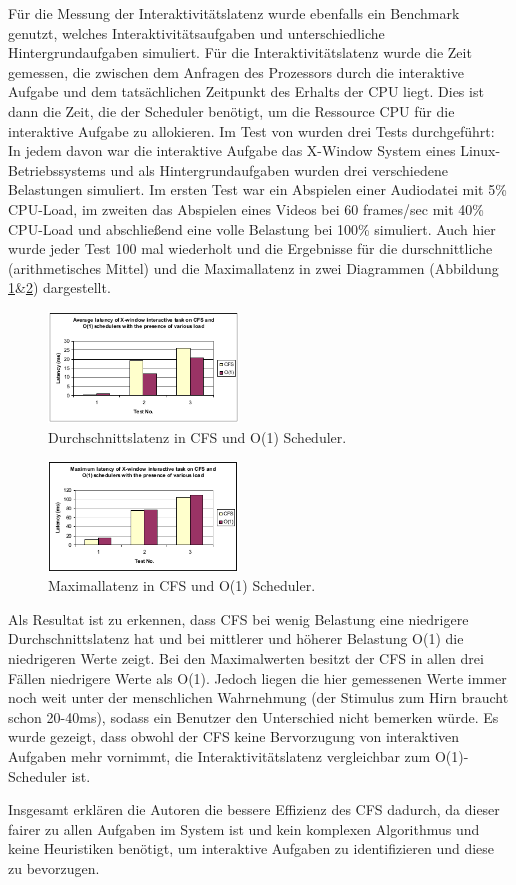 Für die Messung der Interaktivitätslatenz wurde ebenfalls ein Benchmark genutzt, welches Interaktivitätsaufgaben und unterschiedliche Hintergrundaufgaben simuliert. Für die Interaktivitätslatenz wurde die Zeit gemessen, die zwischen dem Anfragen des Prozessors durch die interaktive Aufgabe und dem tatsächlichen Zeitpunkt des Erhalts der CPU liegt. Dies ist dann die Zeit, die der Scheduler benötigt, um die Ressource CPU für die interaktive Aufgabe zu allokieren. Im Test von \cite{papercomparison} wurden drei Tests durchgeführt: In jedem davon war die interaktive Aufgabe das X-Window System eines Linux-Betriebssystems und als Hintergrundaufgaben wurden drei verschiedene Belastungen simuliert. Im ersten Test war ein Abspielen einer Audiodatei mit 5\% CPU-Load, im zweiten das Abspielen eines Videos bei 60 frames/sec mit 40\% CPU-Load und abschließend eine volle Belastung bei 100\% simuliert. Auch hier wurde jeder Test 100 mal wiederholt und die Ergebnisse für die durschnittliche (arithmetisches Mittel) und die Maximallatenz in zwei Diagrammen (Abbildung \ref{fig:avg_latency}\&\ref{fig:max_latency}) dargestellt. 
\begin{figure} [h]
 	\centering
 	\includegraphics[width=0.45\textwidth]{pictures/avg_latency.png}
 	\caption{Durchschnittslatenz in CFS und O(1) Scheduler.}
 	\label{fig:avg_latency}
\end{figure}

\begin{figure} [h]
 	\centering
 	\includegraphics[width=0.45\textwidth]{pictures/max_latency.png}
 	\caption{Maximallatenz in CFS und O(1) Scheduler.}
 	\label{fig:max_latency}
\end{figure}
Als Resultat ist zu erkennen, dass CFS bei wenig Belastung eine niedrigere Durchschnittslatenz hat und bei mittlerer und höherer Belastung O(1) die niedrigeren Werte zeigt. Bei den Maximalwerten besitzt der CFS in allen drei Fällen niedrigere Werte als O(1). Jedoch liegen die hier gemessenen Werte immer noch weit unter der menschlichen Wahrnehmung (der Stimulus zum Hirn braucht schon 20-40ms), sodass ein Benutzer den Unterschied nicht bemerken würde. Es wurde gezeigt, dass obwohl der CFS keine Bervorzugung von interaktiven Aufgaben mehr vornimmt, die Interaktivitätslatenz vergleichbar zum O(1)-Scheduler ist. 

Insgesamt erklären die Autoren die bessere Effizienz des CFS dadurch, da dieser fairer zu allen Aufgaben im System ist und kein komplexen Algorithmus und keine Heuristiken benötigt, um interaktive Aufgaben zu identifizieren und diese zu bevorzugen.